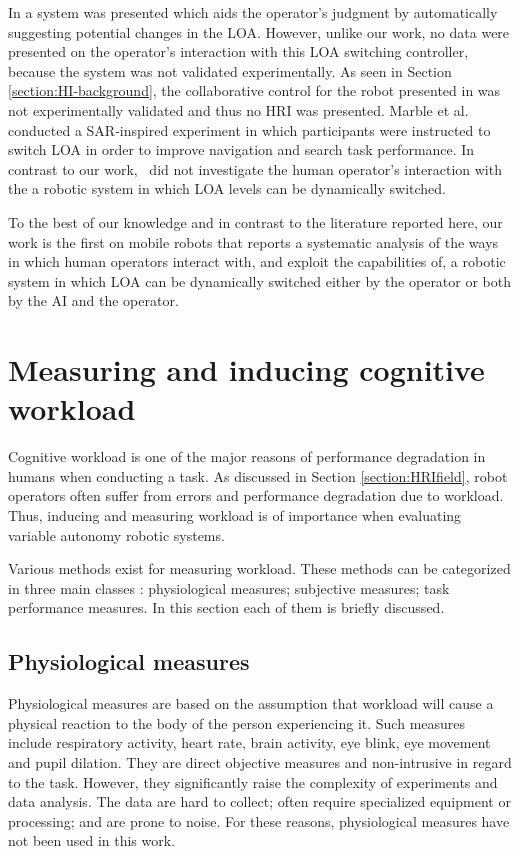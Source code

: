 \documentclass[a4paper,12pt,oneside,openright]{bhamthesis}
\begin{document}
In \citep{Baker2004b} a system was presented which aids the operator's judgment by automatically suggesting potential changes in the LOA. However, unlike our work, no data were presented on the operator's interaction with this LOA switching controller, because the system was not validated experimentally. As seen in Section \ref{section:HI-background}, the collaborative control for the robot presented in \citep{Ibanez-Guzman2004} was not experimentally validated and thus no HRI was presented. Marble et al.~\citep{Marble2004} conducted a SAR-inspired experiment in which participants were instructed to switch LOA in order to improve navigation and search task performance. In contrast to our work,~\citep{Marble2004} did not investigate the human operator's interaction with the a robotic system in which LOA levels can be dynamically switched. 

To the best of our knowledge and in contrast to the literature reported here, our work is the first on mobile robots that reports a systematic analysis of the ways in which human operators interact with, and exploit the capabilities of, a robotic system in which LOA can be dynamically switched either by the operator or both by the AI and the operator.

\section{Measuring and inducing cognitive workload}
\label{chapter2:workload}
Cognitive workload is one of the major reasons of performance degradation in humans when conducting a task. As discussed in Section \ref{section:HRIfield}, robot operators often suffer from errors and performance degradation due to workload. Thus, inducing and measuring workload is of importance when evaluating variable autonomy robotic systems.

Various methods exist for measuring workload. These methods can be categorized in three main classes \citep{Farmer2003}: physiological measures; subjective measures; task performance measures. In this section each of them is briefly discussed. 

\subsection{Physiological measures}
Physiological measures are based on the assumption that workload will cause a physical reaction to the body of the person experiencing it. Such measures include respiratory activity, heart rate, brain activity, eye blink, eye movement and pupil dilation. They are direct objective measures and non-intrusive in regard to the task. However, they significantly raise the complexity of experiments and data analysis. The data are hard to collect; often require specialized equipment or processing; and are prone to noise. For these reasons, physiological measures have not been used in this work.
\end{document}
